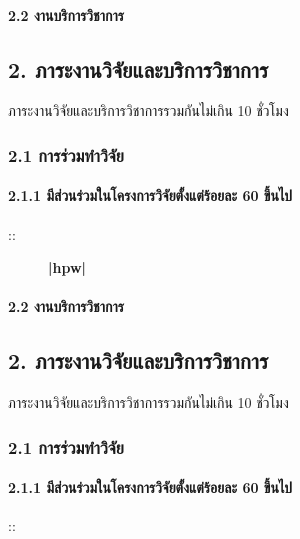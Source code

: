 \documentclass[a4paper,12pt,english]{sphinxmanual}
\begin{document}
\paragraph{2.2 งานบริการวิชาการ}
\label{\detokenize{3service:id4}}

\subsection{2. ภาระงานวิจัยและบริการวิชาการ}
\label{\detokenize{4culture:id1}}\label{\detokenize{4culture::doc}}
ภาระงานวิจัยและบริการวิชาการรวมกันไม่เกิน 10 ชั่วโมง


\subsubsection{2.1 การร่วมทำวิจัย}
\label{\detokenize{4culture:id2}}

\paragraph{2.1.1 มีส่วนร่วมในโครงการวิจัยตั้งแต่ร้อยละ 60 ขึ้นไป}
\label{\detokenize{4culture:id3}}\begin{description}
\item[{::}]   {\color{red}\bfseries{}|hpw|}

\end{description}


\paragraph{2.2 งานบริการวิชาการ}
\label{\detokenize{4culture:id4}}

\subsection{2. ภาระงานวิจัยและบริการวิชาการ}
\label{\detokenize{5etc:id1}}\label{\detokenize{5etc::doc}}
ภาระงานวิจัยและบริการวิชาการรวมกันไม่เกิน 10 ชั่วโมง


\subsubsection{2.1 การร่วมทำวิจัย}
\label{\detokenize{5etc:id2}}

\paragraph{2.1.1 มีส่วนร่วมในโครงการวิจัยตั้งแต่ร้อยละ 60 ขึ้นไป}
\label{\detokenize{5etc:id3}}\begin{description}
\item[{::}]  

\end{description}
\end{document}
